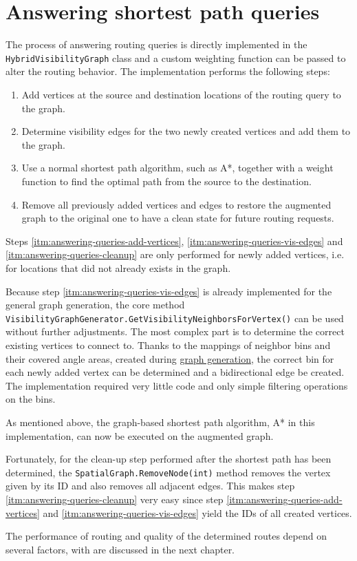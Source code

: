 \section{Answering shortest path queries}
\label{sec:answering-queries}

	The process of answering routing queries is directly implemented in the \texttt{HybridVisibilityGraph} class and a custom weighting function can be passed to alter the routing behavior.
	The implementation performs the following steps:
	\begin{enumerate}
		\item \label{itm:answering-queries-add-vertices} Add vertices at the source and destination locations of the routing query to the graph.
		\item \label{itm:answering-queries-vis-edges} Determine visibility edges for the two newly created vertices and add them to the graph.
		\item \label{itm:answering-queries-routing} Use a normal shortest path algorithm, such as A*, together with a weight function to find the optimal path from the source to the destination.
		\item \label{itm:answering-queries-cleanup} Remove all previously added vertices and edges to restore the augmented graph to the original one to have a clean state for future routing requests.
	\end{enumerate}
	Steps \ref{itm:answering-queries-add-vertices}, \ref{itm:answering-queries-vis-edges} and \ref{itm:answering-queries-cleanup} are only performed for newly added vertices, i.e. for locations that did not already exists in the graph.
	
	Because step \ref{itm:answering-queries-vis-edges} is already implemented for the general graph generation, the core method \texttt{VisibilityGraphGenerator.GetVisibilityNeighborsForVertex()} can be used without further adjustments.
	The most complex part is to determine the correct existing vertices to connect to.
	Thanks to the mappings of neighbor bins and their covered angle areas, created during \hyperref[subsec:step-3-graph-creation]{graph generation}, the correct bin for each newly added vertex can be determined and a bidirectional edge be created.
	The implementation required very little code and only simple filtering operations on the bins.
	
	As mentioned above, the graph-based shortest path algorithm, A* in this implementation, can now be executed on the augmented graph.
	
	Fortunately, for the clean-up step performed after the shortest path has been determined, the \texttt{SpatialGraph.RemoveNode(int)} method removes the vertex given by its ID and also removes all adjacent edges.
	This makes step \ref{itm:answering-queries-cleanup} very easy since step \ref{itm:answering-queries-add-vertices} and \ref{itm:answering-queries-vis-edges} yield the IDs of all created vertices.
	
	The performance of routing and quality of the determined routes depend on several factors, with are discussed in the next chapter.
